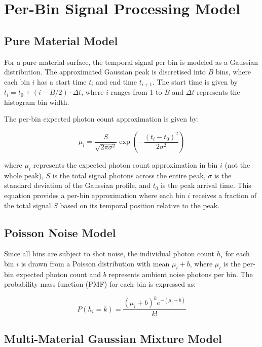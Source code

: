 \documentclass[10pt,twocolumn]{article}
\begin{document}
\section{Per-Bin Signal Processing Model}

\subsection{Pure Material Model}

For a pure material surface, the temporal signal per bin is modeled as a Gaussian distribution. The approximated Gaussian peak is discretised into $B$ bins, where each bin $i$ has a start time $t_i$ and end time $t_{i+1}$. The start time is given by $t_i = t_0 + (i - B/2) \cdot \Delta t$, where $i$ ranges from 1 to $B$ and $\Delta t$ represents the histogram bin width.

The per-bin expected photon count approximation is given by:

\begin{equation}
\mu_i = \frac{S}{\sqrt{2\pi\sigma^2}} \exp\left(-\frac{(t_i - t_0)^2}{2\sigma^2}\right)
\end{equation}

where $\mu_i$ represents the expected photon count approximation in bin $i$ (not the whole peak), $S$ is the total signal photons across the entire peak, $\sigma$ is the standard deviation of the Gaussian profile, and $t_0$ is the peak arrival time. This equation provides a per-bin approximation where each bin $i$ receives a fraction of the total signal $S$ based on its temporal position relative to the peak.

\subsection{Poisson Noise Model}

Since all bins are subject to shot noise, the individual photon count $h_i$ for each bin $i$ is drawn from a Poisson distribution with mean $\mu_i + b$, where $\mu_i$ is the per-bin expected photon count and $b$ represents ambient noise photons per bin. The probability mass function (PMF) for each bin is expressed as:

\begin{equation}
P(h_i = k) = \frac{(\mu_i + b)^k e^{-(\mu_i + b)}}{k!}
\end{equation}

\subsection{Multi-Material Gaussian Mixture Model}
\end{document}
